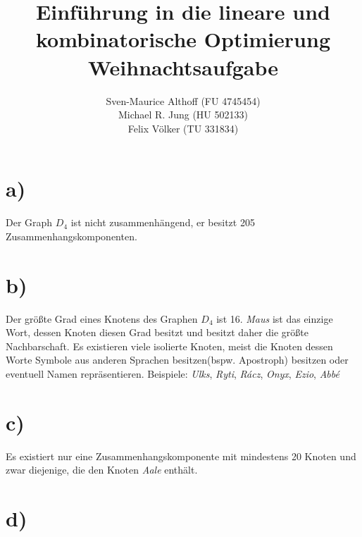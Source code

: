 \documentclass[a4paper,12pt,german]{scrartcl}
\title{Einführung in die lineare und kombinatorische Optimierung\\
Weihnachtsaufgabe}
\author{Sven-Maurice Althoff (FU 4745454)\\Michael R. Jung (HU 502133)\\Felix Völker (TU 331834)}
\begin{document}
\maketitle

\section*{a)}
Der Graph $D_4$ ist nicht zusammenhängend, er besitzt 205 Zusammenhangskomponenten. 
\section*{b)}
Der größte Grad eines Knotens des Graphen $D_4$ ist 16. \textit{Maus} ist das einzige Wort, dessen Knoten diesen Grad besitzt und besitzt daher die größte Nachbarschaft. Es existieren viele isolierte Knoten, meist die Knoten dessen Worte Symbole aus anderen Sprachen besitzen(bspw. Apostroph) besitzen oder eventuell Namen repräsentieren. Beispiele: \textit{Ulks}, \textit{Ryti}, \textit{Rácz}, \textit{Onyx}, \textit{Ezio}, \textit{Abbé}
\section*{c)}
Es existiert nur eine Zusammenhangskomponente mit mindestens 20 Knoten und zwar diejenige, die den Knoten \textit{Aale} enthält. 
\section*{d)}
\end{document}
